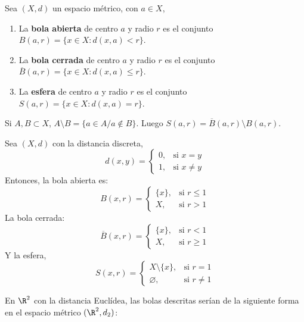\begin{ndef}
  Sea $(X,d)$ un espacio métrico, con $a \in X$,
  \begin{enumerate}
    \item La \textbf{bola abierta} de centro $a$ y radio $r$ es el conjunto $B(a,r)= \{x \in X : d(x,a) < r\}$.
    \item La \textbf{bola cerrada} de centro $a$ y radio $r$ es el conjunto $\overline{B}(a,r)= \{x \in X : d(  x,a) \leq r\}$.
    \item La \textbf{esfera} de centro $a$ y radio $r$ es el conjunto $S(a,r)= \{x \in X : d(  x,a) = r\}$.
  \end{enumerate}
\end{ndef}
\begin{note}
    Si $A,B \subset X$, $A\setminus B = \{a \in A / a \not \in B\}$. Luego $S(a,r) = \overline{B}(a,r) \setminus B(a,r)$.
\end{note}
\begin{exmp}
  Sea $(X,d)$ con la distancia discreta,
  \[ d(x,y)=
    \begin{cases}
      0, & \text{si } x=y \\ 1,& \text{si } x\neq y
    \end{cases}\]
    Entonces, la bola abierta es:
    \[ B(x,r)=
    \begin{cases}
      \{x\}, & \text{si } r \leq 1 \\ X,& \text{si } r > 1
    \end{cases}\]
    La bola cerrada:
    \[ \overline{B}(x,r)=
    \begin{cases}
      \{x\}, & \text{si } r < 1 \\ X,& \text{si } r \geq 1
    \end{cases}\]
    Y la esfera,
    \[ S(x,r)=
    \begin{cases}
      X \setminus \{x\}, & \text{si } r = 1 \\ \varnothing,& \text{si } r \neq 1
    \end{cases}\]
\end{exmp}

\begin{exmp}
  En $\R^2$ con la distancia Euclídea, las bolas descritas serían de la siguiente forma en el espacio métrico $(\R^2,d_2)$:
  \begin{center}
\end{center}
\end{exmp}

